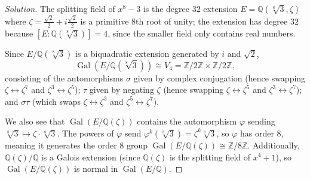 \documentclass[10pt]{article}
\providecommand{\Gal}{\operatorname{Gal}}
\providecommand{\QQ}{\mathbb Q}
\providecommand{\ZZ}{\mathbb Z}
\newenvironment{soln}{\begin{proof}[Solution]}{\end{proof}}
\begin{document}
\begin{soln}
    The splitting field of $x^8 - 3$ is the degree $32$ extension
    $E = \QQ(\sqrt[8]3, \zeta)$ where
    $\zeta = \frac{\sqrt 2}2 + i\frac{\sqrt 2}2$
    is a primitive $8$th root of unity; the extension has degree $32$
    because $[E : \QQ(\sqrt[8]3)] = 4$,
    since the smaller field only contains real numbers.

    Since $E/\QQ(\sqrt[8]3)$ is a biquadratic extension
    generated by $i$ and $\sqrt 2$,
    \[
	\Gal(E/\QQ(\sqrt[8]3))\cong V_4 = \ZZ/2\ZZ\times\ZZ/2\ZZ,
    \]
    consisting of the automorphisms
    $\sigma$ given by complex conjugation
    (hence swapping $\zeta\leftrightarrow\zeta^7$
    and $\zeta^3\leftrightarrow \zeta^5$);
    $\tau$ given by negating $\zeta$
    (hence swapping $\zeta\leftrightarrow\zeta^5$
    and $\zeta^3\leftrightarrow\zeta^7$);
    and $\sigma\tau$ (which swaps $\zeta\leftrightarrow\zeta^3$
    and $\zeta^5\leftrightarrow\zeta^7$).

    We also see that $\Gal(E/\QQ(\zeta))$ contains the automorphism
    $\varphi$ sending $\sqrt[8]3\mapsto\zeta\cdot \sqrt[8]3$.
    The powers of $\varphi$ send
    $\varphi^k(\sqrt[8]3) = \zeta^k\sqrt[8]3$, so
    $\varphi$ has order $8$, meaning it generates
    the order $8$ group $\Gal(E/\QQ(\zeta))\cong\ZZ/8\ZZ$.
    Additionally, $\QQ(\zeta)/\QQ$ is a Galois extension
    (since $\QQ(\zeta)$ is the splitting field of $x^4 + 1$),
    so $\Gal(E/\QQ(\zeta))$ is normal in $\Gal(E/\QQ)$.


\end{soln}
\end{document}
